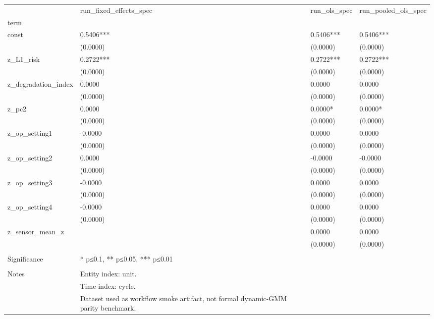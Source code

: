 \begin{tabular}{llll}
\toprule
 & run_fixed_effects_spec & run_ols_spec & run_pooled_ols_spec \\
term &  &  &  \\
\midrule
const & 0.5406*** & 0.5406*** & 0.5406*** \\
 & (0.0000) & (0.0000) & (0.0000) \\
z_L1_risk & 0.2722*** & 0.2722*** & 0.2722*** \\
 & (0.0000) & (0.0000) & (0.0000) \\
z_degradation_index & 0.0000 & 0.0000 & 0.0000 \\
 & (0.0000) & (0.0000) & (0.0000) \\
z_pc2 & 0.0000 & 0.0000* & 0.0000* \\
 & (0.0000) & (0.0000) & (0.0000) \\
z_op_setting1 & -0.0000 & 0.0000 & 0.0000 \\
 & (0.0000) & (0.0000) & (0.0000) \\
z_op_setting2 & 0.0000 & -0.0000 & -0.0000 \\
 & (0.0000) & (0.0000) & (0.0000) \\
z_op_setting3 & -0.0000 & 0.0000 & 0.0000 \\
 & (0.0000) & (0.0000) & (0.0000) \\
z_op_setting4 & -0.0000 & 0.0000 & 0.0000 \\
 & (0.0000) & (0.0000) & (0.0000) \\
z_sensor_mean_z &  & 0.0000 & 0.0000 \\
 &  & (0.0000) & (0.0000) \\
 &  &  &  \\
Significance & * p≤0.1, ** p≤0.05, *** p≤0.01 &  &  \\
 &  &  &  \\
Notes & Entity index: unit. &  &  \\
 & Time index: cycle. &  &  \\
 & Dataset used as workflow smoke artifact, not formal dynamic-GMM parity benchmark. &  &  \\
\bottomrule
\end{tabular}
